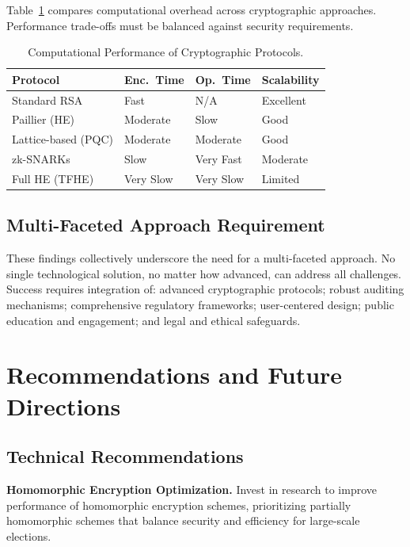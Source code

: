 \documentclass[sigconf,nonacm]{acmart}
\begin{document}
Table~\ref{tab:performance} compares computational overhead across cryptographic
approaches. Performance trade-offs must be balanced against security requirements.

\begin{table}[h]
\caption{Computational Performance of Cryptographic Protocols.}
\label{tab:performance}
\small
\begin{tabularx}{\columnwidth}{@{}p{2.4cm}p{1.4cm}p{1.4cm}X@{}}
\toprule
\textbf{Protocol} & \textbf{Enc.\ Time} & \textbf{Op.\ Time} & \textbf{Scalability} \\
\midrule
Standard RSA        & Fast      & N/A       & Excellent \\
Paillier (HE)       & Moderate  & Slow      & Good \\
Lattice-based (PQC) & Moderate  & Moderate  & Good \\
zk-SNARKs           & Slow      & Very Fast & Moderate \\
Full HE (TFHE)      & Very Slow & Very Slow & Limited \\
\bottomrule
\end{tabularx}
\end{table}

\subsection{Multi-Faceted Approach Requirement}

These findings collectively underscore the need for a multi-faceted approach. No single
technological solution, no matter how advanced, can address all challenges. Success
requires integration of: advanced cryptographic protocols; robust auditing mechanisms;
comprehensive regulatory frameworks; user-centered design; public education and
engagement; and legal and ethical safeguards.

\section{Recommendations and Future Directions}

\subsection{Technical Recommendations}

\textbf{Homomorphic Encryption Optimization.} Invest in research to improve performance
of homomorphic encryption schemes, prioritizing partially homomorphic schemes that
balance security and efficiency for large-scale elections.
\end{document}
